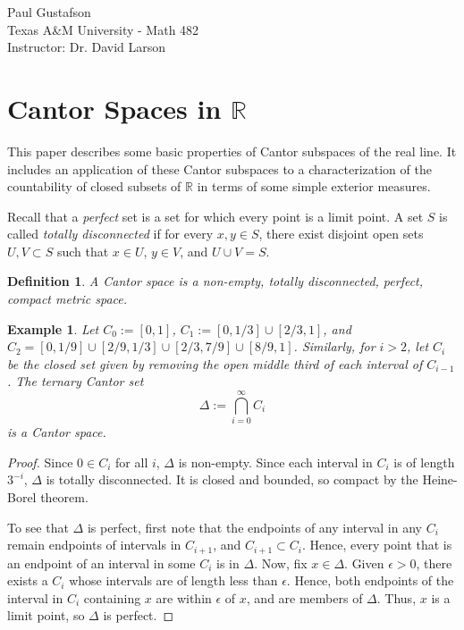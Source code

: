 \documentclass{article}
\newtheorem{definition}{Definition}
\newtheorem{example}{Example}
\newcommand{\R}{\mathbb{R}}
\begin{document}
\noindent Paul Gustafson\\
\noindent Texas A\&M University - Math 482 \\
\noindent Instructor: Dr. David Larson

\section*{Cantor Spaces in $\R$}
This paper describes some basic properties of Cantor subspaces of the real line. It includes an application of these Cantor subspaces to a characterization of the countability of closed subsets of $\R$ in terms of some simple exterior measures.

Recall that a \emph{perfect} set is a set for which every point is a limit point. A set $S$ is called \emph{totally disconnected} if for every $x, y \in S$, there exist disjoint open sets $U,V \subset S$ such that $x \in U$, $y \in V$, and $U \cup V = S$.

\begin{definition}
  A \emph{Cantor space} is a non-empty, totally disconnected, perfect, compact metric space.
\end{definition}

\begin{example}
Let $C_0 := [0,1]$, $C_1 := [0,1/3] \cup [2/3, 1]$, and $C_2 = [0,1/9] \cup [2/9, 1/3] \cup [2/3, 7/9] \cup [8/9, 1]$.
Similarly, for $i > 2$, let $C_i$ be the closed set given by removing the open middle third of each interval of $C_{i-1}$.
The \emph{ternary Cantor set} $$\Delta := \bigcap_{i=0}^\infty {C_i}$$ is a Cantor space.
\end{example}
\begin{proof}
Since $0 \in C_i$ for all $i$, $\Delta$ is non-empty. Since each interval in $C_i$ is of length $3^{-i}$, $\Delta$ is totally disconnected. It is closed and bounded,
so compact by the Heine-Borel theorem. 

To see that $\Delta$ is perfect, first note that the endpoints of any interval in any $C_i$ remain endpoints of intervals in $C_{i+1}$, and $C_{i+1} \subset C_i$.
Hence, every point that is an endpoint of an interval in some $C_i$ is in $\Delta$. Now, fix $x \in \Delta$. Given $\epsilon > 0$, there exists a $C_i$ whose intervals are of length less than $\epsilon$. Hence, both endpoints of the interval in $C_i$ containing $x$ are within $\epsilon$ of $x$, and are members of $\Delta$.  Thus, $x$ is a limit point, so $\Delta$ is perfect.
\end{proof}
\end{document}
